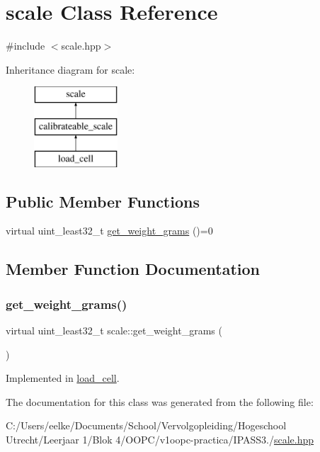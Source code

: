 \hypertarget{classscale}{}\section{scale Class Reference}
\label{classscale}


{\ttfamily \#include $<$scale.\+hpp$>$}

Inheritance diagram for scale\+:\begin{figure}[H]
\begin{center}
\leavevmode
\includegraphics[height=3.000000cm]{classscale}
\end{center}
\end{figure}
\subsection*{Public Member Functions}
\begin{DoxyCompactItemize}
\item 
virtual uint\+\_\+least32\+\_\+t \hyperlink{classscale_a5e4285443c8134821fa5c6ac92a0afeb}{get\+\_\+weight\+\_\+grams} ()=0
\end{DoxyCompactItemize}


\subsection{Member Function Documentation}
\mbox{\label{classscale_a5e4285443c8134821fa5c6ac92a0afeb}} 
\subsubsection{\texorpdfstring{get\+\_\+weight\+\_\+grams()}{get\_weight\_grams()}}
{\footnotesize\ttfamily virtual uint\+\_\+least32\+\_\+t scale\+::get\+\_\+weight\+\_\+grams (\begin{DoxyParamCaption}{ }\end{DoxyParamCaption})\hspace{0.3cm}{\ttfamily [pure virtual]}}



Implemented in \hyperlink{classload__cell_abfeb7f8e36c101c12035e45fae7f7a64}{load\+\_\+cell}.



The documentation for this class was generated from the following file\+:\begin{DoxyCompactItemize}
\item 
C\+:/\+Users/eelke/\+Documents/\+School/\+Vervolgopleiding/\+Hogeschool Utrecht/\+Leerjaar 1/\+Blok 4/\+O\+O\+P\+C/v1oopc-\/practica/\+I\+P\+A\+S\+S3./\hyperlink{scale_8hpp}{scale.\+hpp}\end{DoxyCompactItemize}
